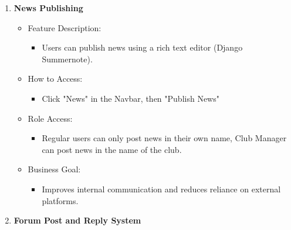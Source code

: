 \begin{enumerate}
\begin{itemize}
        \begin{itemize}
        \item
          Only club manager
        \end{itemize}
      \item
        Business Goal:
    
        \begin{itemize}
        \item
          Enhances structural efficiency and supports autonomous society
          club operations.
        \end{itemize}
      \end{itemize}
    \item
      \textbf{News Publishing}
    
      \begin{itemize}
      \item
        Feature Description:
    
        \begin{itemize}
        \item
          Users can publish news using a rich text editor (Django
          Summernote).
        \end{itemize}
      \item
        How to Access:
    
        \begin{itemize}
        \item
          Click "News" in the Navbar, then "Publish News"
        \end{itemize}
      \item
        Role Access:
    
        \begin{itemize}
        \item
          Regular users can only post news in their own name, Club Manager
          can post news in the name of the club.
        \end{itemize}
      \item
        Business Goal:
    
        \begin{itemize}
        \item
          Improves internal communication and reduces reliance on external
          platforms.
        \end{itemize}
      \end{itemize}
    \item
      \textbf{Forum Post and Reply System}
    

\end{enumerate}
